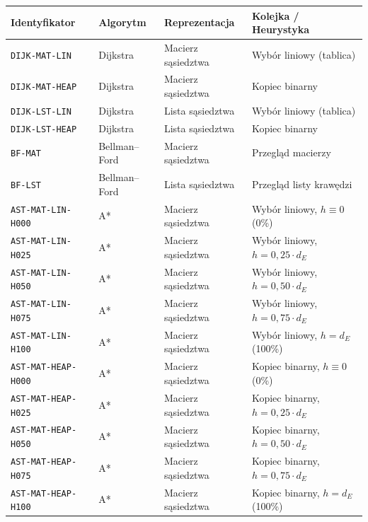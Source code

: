 \documentclass[11pt,a4paper,oneside]{report}
\begin{document}
\begin{table}[H]
  \centering
  \footnotesize
  \renewcommand{\arraystretch}{1.08}
  \begin{tabularx}{\textwidth}{@{}p{}p{}p{}X@{}}
    \toprule
    \textbf{Identyfikator} & \textbf{Algorytm} & \textbf{Reprezentacja} & \textbf{Kolejka / Heurystyka} \\
    \midrule
    \texttt{DIJK-MAT-LIN}  & Dijkstra & Macierz sąsiedztwa & Wybór liniowy (tablica) \\
    \texttt{DIJK-MAT-HEAP} & Dijkstra & Macierz sąsiedztwa & Kopiec binarny \\
    \texttt{DIJK-LST-LIN}  & Dijkstra & Lista sąsiedztwa  & Wybór liniowy (tablica) \\
    \texttt{DIJK-LST-HEAP} & Dijkstra & Lista sąsiedztwa  & Kopiec binarny \\
    \midrule
    \texttt{BF-MAT}        & Bellman--Ford & Macierz sąsiedztwa & Przegląd macierzy \\
    \texttt{BF-LST}        & Bellman--Ford & Lista sąsiedztwa  & Przegląd listy krawędzi \\
    \midrule
    \texttt{AST-MAT-LIN-H000} & A* & Macierz sąsiedztwa & Wybór liniowy, $h \equiv 0$ (0\%) \\
    \texttt{AST-MAT-LIN-H025} & A* & Macierz sąsiedztwa & Wybór liniowy, $h = 0{,}25 \cdot d_E$ \\
    \texttt{AST-MAT-LIN-H050} & A* & Macierz sąsiedztwa & Wybór liniowy, $h = 0{,}50 \cdot d_E$ \\
    \texttt{AST-MAT-LIN-H075} & A* & Macierz sąsiedztwa & Wybór liniowy, $h = 0{,}75 \cdot d_E$ \\
    \texttt{AST-MAT-LIN-H100} & A* & Macierz sąsiedztwa & Wybór liniowy, $h = d_E$ (100\%) \\
    \midrule
    \texttt{AST-MAT-HEAP-H000} & A* & Macierz sąsiedztwa & Kopiec binarny, $h \equiv 0$ (0\%) \\
    \texttt{AST-MAT-HEAP-H025} & A* & Macierz sąsiedztwa & Kopiec binarny, $h = 0{,}25 \cdot d_E$ \\
    \texttt{AST-MAT-HEAP-H050} & A* & Macierz sąsiedztwa & Kopiec binarny, $h = 0{,}50 \cdot d_E$ \\
    \texttt{AST-MAT-HEAP-H075} & A* & Macierz sąsiedztwa & Kopiec binarny, $h = 0{,}75 \cdot d_E$ \\
    \texttt{AST-MAT-HEAP-H100} & A* & Macierz sąsiedztwa & Kopiec binarny, $h = d_E$ (100\%) \\
    \midrule

\end{tabularx}
\end{table}
\end{document}

